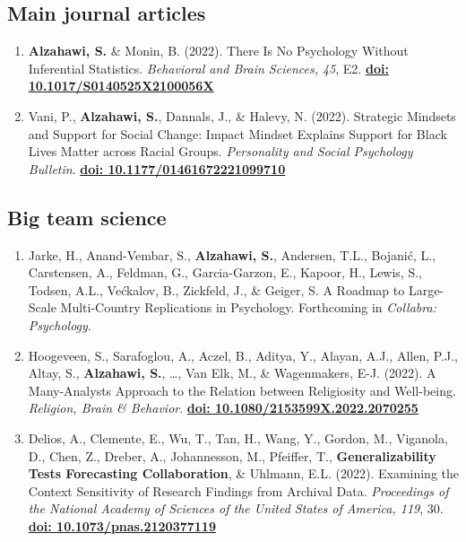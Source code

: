 \documentclass[11pt,a4paper,]{awesome-cv}
\begin{document}
\hypertarget{main-journal-articles}{%
\subsection{Main journal articles}\label{main-journal-articles}}

\begin{enumerate}
\def\labelenumi{\arabic{enumi}.}
\item
  \textbf{Alzahawi, S.} \& Monin, B. (2022). There Is No Psychology
  Without Inferential Statistics. \emph{Behavioral and Brain Sciences,
  45}, E2.
  \href{https://www.doi.org/10.1017/S0140525X2100056X}{\textbf{doi:
  10.1017/S0140525X2100056X}}
\item
  Vani, P., \textbf{Alzahawi, S.}, Dannals, J., \& Halevy, N. (2022).
  Strategic Mindsets and Support for Social Change: Impact Mindset
  Explains Support for Black Lives Matter across Racial Groups.
  \emph{Personality and Social Psychology Bulletin}.
  \href{https://www.doi.org/10.1177/01461672221099710}{\textbf{doi:
  10.1177/01461672221099710}}
\end{enumerate}

\hypertarget{big-team-science}{%
\subsection{Big team science}\label{big-team-science}}

\begin{enumerate}
\def\labelenumi{\arabic{enumi}.}
\setcounter{enumi}{2}
\item
  Jarke, H., Anand-Vembar, S., \textbf{Alzahawi, S.}, Andersen, T.L.,
  Bojanić, L., Carstensen, A., Feldman, G., Garcia-Garzon, E., Kapoor,
  H., Lewis, S., Todsen, A.L., Većkalov, B., Zickfeld, J., \& Geiger, S.
  A Roadmap to Large-Scale Multi-Country Replications in Psychology.
  Forthcoming in \emph{Collabra: Psychology}.
\item
  Hoogeveen, S., Sarafoglou, A., Aczel, B., Aditya, Y., Alayan, A.J.,
  Allen, P.J., Altay, S., \textbf{Alzahawi, S.}, \ldots, Van Elk, M., \&
  Wagenmakers, E-J. (2022). A Many-Analysts Approach to the Relation
  between Religiosity and Well-being. \emph{Religion, Brain \&
  Behavior}.
  \href{https://doi.org/10.1080/2153599X.2022.2070255}{\textbf{doi:
  10.1080/2153599X.2022.2070255}}
\item
  Delios, A., Clemente, E., Wu, T., Tan, H., Wang, Y., Gordon, M.,
  Viganola, D., Chen, Z., Dreber, A., Johannesson, M., Pfeiffer, T.,
  \textbf{Generalizability Tests Forecasting Collaboration}, \& Uhlmann,
  E.L. (2022). Examining the Context Sensitivity of Research Findings
  from Archival Data. \emph{Proceedings of the National Academy of
  Sciences of the United States of America, 119}, 30.
  \href{https://doi.org/10.1073/pnas.2120377119}{\textbf{doi:
  10.1073/pnas.2120377119}}
\end{enumerate}
\end{document}
